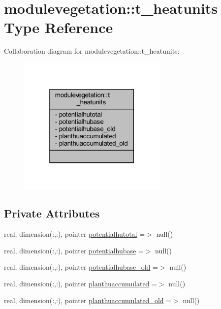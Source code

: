 \hypertarget{structmodulevegetation_1_1t__heatunits}{}\section{modulevegetation\+:\+:t\+\_\+heatunits Type Reference}
\label{structmodulevegetation_1_1t__heatunits}


Collaboration diagram for modulevegetation\+:\+:t\+\_\+heatunits\+:\nopagebreak
\begin{figure}[H]
\begin{center}
\leavevmode
\includegraphics[width=208pt]{structmodulevegetation_1_1t__heatunits__coll__graph}
\end{center}
\end{figure}
\subsection*{Private Attributes}
\begin{DoxyCompactItemize}
\item 
real, dimension(\+:,\+:), pointer \mbox{\hyperlink{structmodulevegetation_1_1t__heatunits_a1611f68cf8eb8d9aced1fd74c77b51b8}{potentialhutotal}} =$>$ null()
\item 
real, dimension(\+:,\+:), pointer \mbox{\hyperlink{structmodulevegetation_1_1t__heatunits_ac0536d4175cd4c66444f6cec0a6f2139}{potentialhubase}} =$>$ null()
\item 
real, dimension(\+:,\+:), pointer \mbox{\hyperlink{structmodulevegetation_1_1t__heatunits_ac9b991b947641618de639b5af6dcdcc9}{potentialhubase\+\_\+old}} =$>$ null()
\item 
real, dimension(\+:,\+:), pointer \mbox{\hyperlink{structmodulevegetation_1_1t__heatunits_a1838082b47b73d26809e34de3e8a5b0e}{planthuaccumulated}} =$>$ null()
\item 
real, dimension(\+:,\+:), pointer \mbox{\hyperlink{structmodulevegetation_1_1t__heatunits_aaa3d9461a47b825fcefb84aaf66d1daf}{planthuaccumulated\+\_\+old}} =$>$ null()
\end{DoxyCompactItemize}


